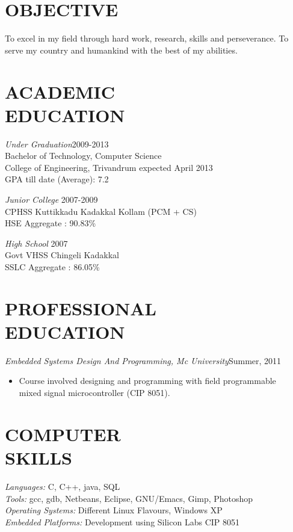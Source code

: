 \documentclass[line,margin]{res}
\begin{document}
\address{2vineethvs@gmail.com}
\address{+91 9847109218}

 
\begin{resume}
 
\section{OBJECTIVE}
  To excel in my field through hard work, research, skills and perseverance. To serve my country and humankind with the best of my abilities.
 
\section{ACADEMIC \\ EDUCATION} {\sl Under Graduation}\hfill 2009-2013\\
   Bachelor of Technology, Computer Science \\
   College of Engineering, Trivandrum expected April 2013\\
   GPA till date (Average): 7.2

   {\sl Junior College} \hfill 2007-2009\\
   CPHSS Kuttikkadu Kadakkal Kollam (PCM + CS)\\
   HSE Aggregate : 90.83\% 
   
   {\sl High School} \hfill 2007\\
   Govt VHSS Chingeli Kadakkal\\
   SSLC Aggregate : 86.05\% 

\section{PROFESSIONAL \\ EDUCATION}  {\sl Embedded Systems Design And Programming, Mc University}\hfill Summer, 2011
 \begin{itemize}  \itemsep -2pt %
   \item 
     Course involved designing and programming with field programmable\\ mixed signal microcontroller (CIP 8051).
   \end{itemize}



\section{COMPUTER \\ SKILLS} {\sl Languages:} C, C++, java, SQL\\
   {\sl Tools:}  gcc, gdb, Netbeans, Eclipse, GNU/Emacs, Gimp, Photoshop\\
   {\sl Operating Systems:} Different Linux Flavours, Windows XP\\
   {\sl Embedded Platforms:} Development using Silicon Labs CIP 8051\\
 

\end{resume}
\end{document}
